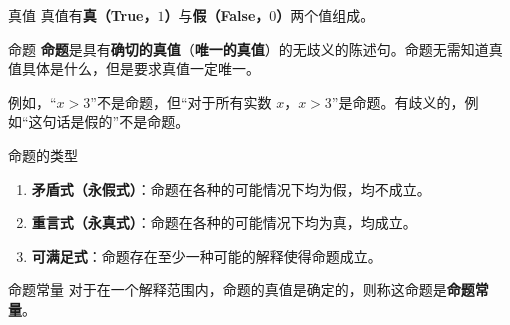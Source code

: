 
\begin{definition}{真值}
真值有\textbf{真（True，$1$）}与\textbf{假（False，$0$）}两个值组成。
\end{definition}

\begin{definition}{命题}
\textbf{命题}是具有\textbf{确切的真值}（\textbf{唯一的真值}）的无歧义的陈述句。命题无需知道真值具体是什么，但是要求真值一定唯一。
\end{definition}
例如，“$x>3$”不是命题，但“对于所有实数 $x$，$x>3$”是命题。有歧义的，例如“这句话是假的”不是命题。

\begin{definition}{命题的类型}
\begin{enumerate}
\item \textbf{矛盾式（永假式）}：命题在各种的可能情况下均为假，均不成立。
\item \textbf{重言式（永真式）}：命题在各种的可能情况下均为真，均成立。
\item \textbf{可满足式}：命题存在至少一种可能的解释使得命题成立。
\end{enumerate}

\end{definition}

\begin{definition}{命题常量}
对于在一个解释范围内，命题的真值是确定的，则称这命题是\textbf{命题常量}。
\end{definition}
\bdefin
